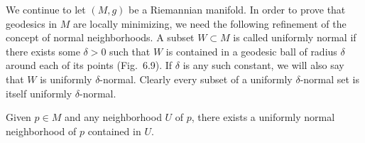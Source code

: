 We continue to let $(M,g)$ be a Riemannian manifold. In order to prove that geodesics in $M$ are locally minimizing, we need the following refinement of the concept of normal neighborhoods. A subset $W \subset M$ is called uniformly normal if there exists some $\delta > 0$ such that $W$ is contained in a geodesic ball of radius $\delta$ around each of its points (Fig.\ 6.9). If $\delta$ is any such constant, we will also say that $W$ is uniformly $\delta$-normal. Clearly every subset of a uniformly $\delta$-normal set is itself uniformly $\delta$-normal.

\begin{lemma}
\label{lem:uniformly-normal-neighborhood}

Given $p \in M$ and any neighborhood $U$ of $p$, there exists a uniformly normal neighborhood of $p$ contained in $U$.
\end{lemma}

